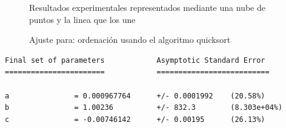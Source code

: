 
\begin{figure}[H]%
    \centering
    \caption{Resultados experimentales representados mediante una nube de puntos y la linea que los une}%
    \centering
    \caption{Ajuste para: ordenación usando el algoritmo quicksort}%
\end{figure}

\begin{verbatim}
Final set of parameters            Asymptotic Standard Error
=======================            ==========================

a               = 0.000967764      +/- 0.0001992    (20.58%)
b               = 1.00236          +/- 832.3        (8.303e+04%)
c               = -0.00746142      +/- 0.00195      (26.13%)


\end{verbatim}
